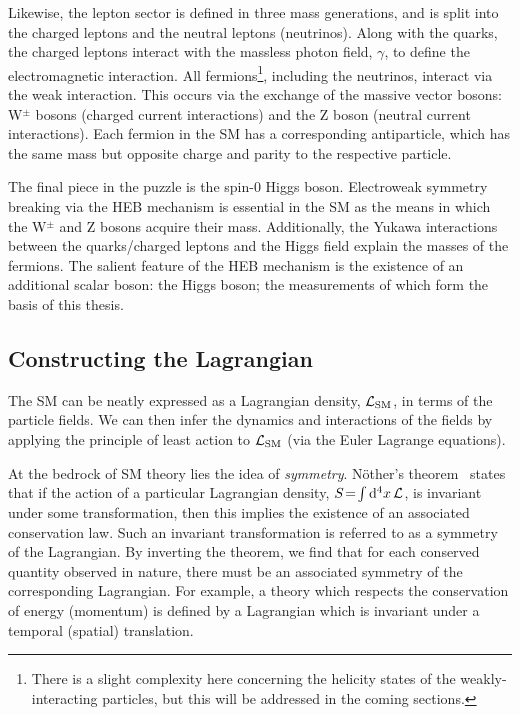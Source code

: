 Likewise, the lepton sector is defined in three mass generations, and is split into the charged leptons and the neutral leptons (neutrinos). Along with the quarks, the charged leptons interact with the massless photon field, $\gamma$, to define the electromagnetic interaction. All fermions\footnote{There is a slight complexity here concerning the helicity states of the weakly-interacting particles, but this will be addressed in the coming sections.}, including the neutrinos, interact via the weak interaction. This occurs via the exchange of the massive vector bosons: W$^{\pm}$ bosons (charged current interactions) and the Z boson (neutral current interactions). Each fermion in the SM has a corresponding antiparticle, which has the same mass but opposite charge and parity to the respective particle.

The final piece in the puzzle is the spin-0 Higgs boson. Electroweak symmetry breaking via the HEB mechanism is essential in the SM as the means in which the W$^{\pm}$ and Z bosons acquire their mass. Additionally, the Yukawa interactions between the quarks/charged leptons and the Higgs field explain the masses of the fermions. The salient feature of the HEB mechanism is the existence of an additional scalar boson: the Higgs boson; the measurements of which form the basis of this thesis.

\subsection{Constructing the Lagrangian}
The SM can be neatly expressed as a Lagrangian density, $\mathcal{L}_{\rm{SM}}$, in terms of the particle fields. We can then infer the dynamics and interactions of the fields by applying the principle of least action to $\mathcal{L}_{\rm{SM}}$ (via the Euler Lagrange equations). 

At the bedrock of SM theory lies the idea of \textit{symmetry}. N\"{o}ther's theorem~\cite{doi:10.1080_00411457108231446} states that if the action of a particular Lagrangian density, $S \!=\! \int {\rm{d}}^4x\, \mathcal{L}$, is invariant under some transformation, then this implies the existence of an associated conservation law. Such an invariant transformation is referred to as a symmetry of the Lagrangian. By inverting the theorem, we find that for each conserved quantity observed in nature, there must be an associated symmetry of the corresponding Lagrangian. For example, a theory which respects the conservation of energy (momentum) is defined by a Lagrangian which is invariant under a temporal (spatial) translation.

